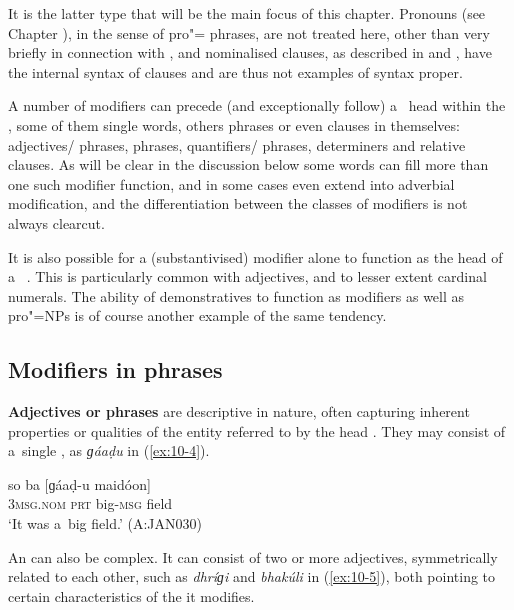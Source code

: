 It is the latter type that will be the main focus of this chapter. Pronouns (see Chapter ), in the sense of pro"= phrases, are not treated here, other than very briefly in connection with , and nominalised clauses, as described in  and , have the internal syntax of clauses and are thus not examples of   syntax proper. 


A number of modifiers can precede (and exceptionally follow) a~ head within the  , some of them single words, others phrases or even clauses in themselves: adjectives/ phrases,  phrases, quantifiers/ phrases, determiners and relative clauses. As will be clear in the discussion below some words can fill more than one such modifier function, and in some cases even extend into adverbial modification, and the differentiation between the classes of modifiers is not always clearcut.


It is also possible for a (substantivised) modifier alone to function as the head of a~ . This is particularly common with adjectives, and to lesser extent cardinal numerals. The ability of demonstratives to function as modifiers as well as pro"=NPs is of course another example of the same tendency.


\subsection{Modifiers in  phrases}
\label{subsec:10-1-2}


\textbf{Adjectives or  phrases} are descriptive in nature, often capturing inherent properties or qualities of the entity referred to by the head . They may consist of a~single , as \textit{ɡáaḍu} in (\ref{ex:10-4}).

\begin{exe}
\ex
\label{ex:10-4}
\gll so ba [ɡáaḍ-u maidóon] \\
\textsc{3msg.nom} \textsc{prt} big-\textsc{msg} field \\
\glt `It was a~big field.' (A:JAN030)
\end{exe}

An   can also be complex. It can consist of two or more adjectives, symmetrically related to each other, such as \textit{dhríɡi} and \textit{bhakúli} in (\ref{ex:10-5}), both pointing to certain characteristics of the  it modifies. 

